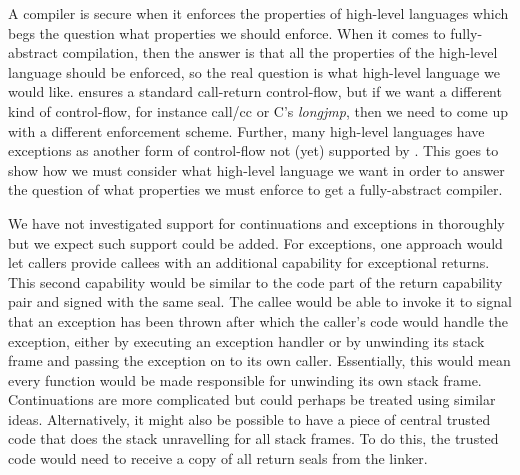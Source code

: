 \begin{jversion}
  A compiler is secure when it enforces the properties of high-level languages which begs the question what properties we should enforce.
  When it comes to fully-abstract compilation, then the answer is that all the properties of the high-level language should be enforced, so the real question is what high-level language we would like.
  \stktokens{} ensures a standard call-return control-flow, but if we want a different kind of control-flow, for instance call/cc or C's \textit{longjmp}, then we need to come up with a different enforcement scheme.
  Further, many high-level languages have exceptions as another form of control-flow not (yet) supported by \stktokens{}.
  This goes to show how we must consider what high-level language we want in order to answer the question of what properties we must enforce to get a fully-abstract compiler.

  We have not investigated support for continuations and exceptions in \stktokens{} thoroughly but we expect such support could be added.
  For exceptions, one approach would let callers provide callees with an additional capability for exceptional returns.
  This second capability would be similar to the code part of the return capability pair and signed with the same seal.
  The callee would be able to invoke it to signal that an exception has been thrown after which the caller's code would handle the exception, either by executing an exception handler or by unwinding its stack frame and passing the exception on to its own caller.
  Essentially, this would mean every function would be made responsible for unwinding its own stack frame.
  Continuations are more complicated but could perhaps be treated using similar ideas.
  Alternatively, it might also be possible to have a piece of central trusted code that does the stack unravelling for all stack frames.
  To do this, the trusted code would need to receive a copy of all return seals from the linker.


\end{jversion}
